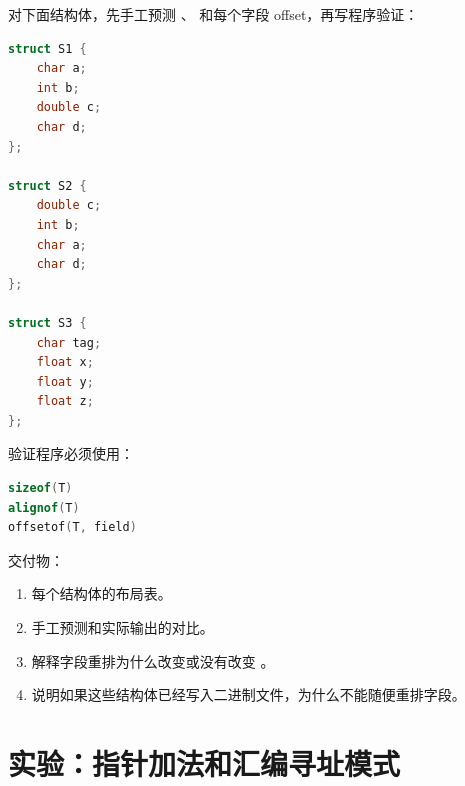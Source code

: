 \begin{labbox}
对下面结构体，先手工预测 、 和每个字段 offset，再写程序验证：

\begin{lstlisting}[language=C++]
struct S1 {
    char a;
    int b;
    double c;
    char d;
};

struct S2 {
    double c;
    int b;
    char a;
    char d;
};

struct S3 {
    char tag;
    float x;
    float y;
    float z;
};
\end{lstlisting}

验证程序必须使用：

\begin{lstlisting}[language=C++]
sizeof(T)
alignof(T)
offsetof(T, field)
\end{lstlisting}

交付物：

\begin{enumerate}
  \item 每个结构体的布局表。
  \item 手工预测和实际输出的对比。
  \item 解释字段重排为什么改变或没有改变 。
  \item 说明如果这些结构体已经写入二进制文件，为什么不能随便重排字段。
\end{enumerate}
\end{labbox}

\section{实验：指针加法和汇编寻址模式}

